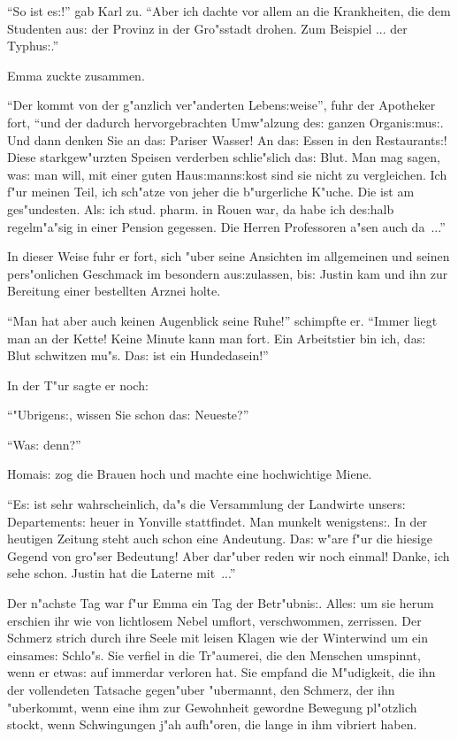 \documentclass[oneside,12pt]{book}
\newenvironment{antiqua}{\normalfont}{}%
\newcommand{\s}{s:}%
\begin{document}
"`So ist e{\s}!"' gab Karl zu. "`Aber ich dachte vor allem an die
Krankheiten, die dem Studenten au{\s} der Provinz in der
Gro"sstadt drohen. Zum Beispiel ... der Typhu{\s}."'

Emma zuckte zusammen.

"`Der kommt von der g"anzlich ver"anderten Leben{\s}weise"', fuhr
der Apotheker fort, "`und der dadurch hervorgebrachten Umw"alzung
de{\s} ganzen Organi{\s}mu{\s}. Und dann denken Sie an da{\s}
Pariser Wasser! An da{\s} Essen in den Restaurant{\s}! Diese
starkgew"urzten Speisen verderben schlie"slich da{\s} Blut. Man
mag sagen, wa{\s} man will, mit einer guten Hau{\s}mann{\s}kost
sind sie nicht zu vergleichen. Ich f"ur meinen Teil, ich sch"atze
von jeher die b"urgerliche K"uche. Die ist am ges"undesten. Al{\s}
ich \begin{antiqua}stud. pharm.\end{antiqua} in Rouen war, da habe
ich de{\s}halb regelm"a"sig in einer Pension gegessen. Die Herren
Professoren a"sen auch da~..."'

In dieser Weise fuhr er fort, sich "uber seine Ansichten im
allgemeinen und seinen pers"onlichen Geschmack im besondern
au{\s}zulassen, bi{\s} Justin kam und ihn zur Bereitung einer
bestellten Arznei holte.

"`Man hat aber auch keinen Augenblick seine Ruhe!"' schimpfte er.
"`Immer liegt man an der Kette! Keine Minute kann man fort. Ein
Arbeitstier bin ich, da{\s} Blut schwitzen mu"s. Da{\s} ist ein
Hundedasein!"'

In der T"ur sagte er noch:

"`"Ubrigen{\s}, wissen Sie schon da{\s} Neueste?"'

"`Wa{\s} denn?"'

Homai{\s} zog die Brauen hoch und machte eine hochwichtige Miene.

"`E{\s} ist sehr wahrscheinlich, da"s die Versammlung der
Landwirte unser{\s} Departement{\s} heuer in Yonville stattfindet.
Man munkelt wenigsten{\s}. In der heutigen Zeitung steht auch
schon eine Andeutung. Da{\s} w"are f"ur die hiesige Gegend von
gro"ser Bedeutung! Aber dar"uber reden wir noch einmal! Danke, ich
sehe schon. Justin hat die Laterne mit~..."'


\newpage\begin{center}
{\large \so{Siebente{\s} Kapitel}}\bigskip\bigskip
\end{center}

Der n"achste Tag war f"ur Emma ein Tag der Betr"ubni{\s}. Alle{\s}
um sie herum erschien ihr wie von lichtlosem Nebel umflort,
verschwommen, zerrissen. Der Schmerz strich durch ihre Seele mit
leisen Klagen wie der Winterwind um ein einsame{\s} Schlo"s. Sie
verfiel in die Tr"aumerei, die den Menschen umspinnt, wenn er
etwa{\s} auf immerdar verloren hat. Sie empfand die M"udigkeit,
die ihn der vollendeten Tatsache gegen"uber "ubermannt, den
Schmerz, der ihn "uberkommt, wenn eine ihm zur Gewohnheit gewordne
Bewegung pl"otzlich stockt, wenn Schwingungen j"ah aufh"oren, die
lange in ihm vibriert haben.
\end{document}
